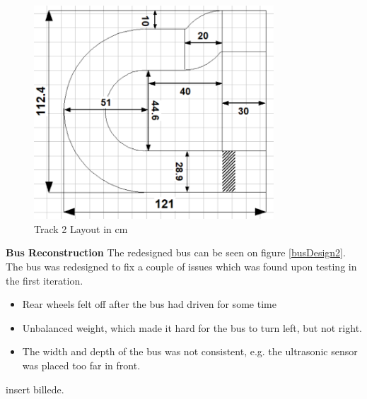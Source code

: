\begin{figure}[H]
    \label{Track2Layout}
    \centering
    \includegraphics[width=0.8\textwidth]{Images/Tracks/Track1.PNG}
    \caption{Track 2 Layout in cm}
\end{figure}

\textbf{Bus Reconstruction} \newline
The redesigned bus can be seen on figure \ref{busDesign2}. The bus was redesigned to fix a couple of issues which was found upon testing in the first iteration.

\begin{itemize}
  \item Rear wheels felt off after the bus had driven for some time
  \item Unbalanced weight, which made it hard for the bus to turn left, but not right.
  \item The width and depth of the bus was not consistent, e.g. the ultrasonic sensor was placed too far in front. 

\end{itemize}

insert billede.














